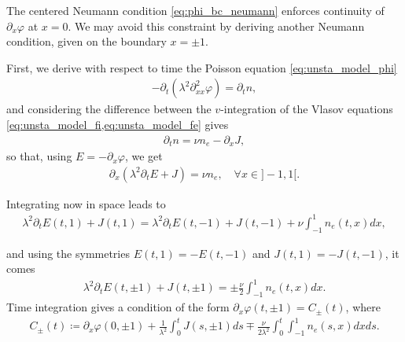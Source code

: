 \documentclass{article}
\numberwithin{equation}{section}
\newcommand{\R}{\mathbb{R}}
\begin{document}
 The centered Neumann condition \cref{eq:phi_bc_neumann} enforces continuity of $\partial_x \varphi$ at $x=0$. We may avoid this constraint by deriving another Neumann condition, given on the boundary $x=\pm 1$.
 
First, we derive with respect to time the Poisson equation \cref{eq:unsta_model_phi}
\begin{align*}
	- \partial_t (\lambda^2\partial_{xx}^2 \varphi) = \partial_t n, 	
\end{align*}
and considering the difference between the $v$-integration of the Vlasov equations \cref{eq:unsta_model_fi,eq:unsta_model_fe} gives 
\begin{align*}
	\partial_t n = \nu n_e - \partial_x J,
\end{align*}
so that, using $E=-\partial_x \varphi$, we get 
\begin{align*}
	\partial_x (\lambda^2\partial_t E + J) = \nu n_e, \quad \forall x\in ]-1, 1[. 	
\end{align*}

Integrating now in space leads to 
\begin{align}\label{eq:ampere_integ}
	\lambda^2\partial_t E(t, 1) + J(t, 1) = \lambda^2\partial_t E(t, -1) + J(t, -1) +\nu \int_{-1}^1 n_e (t, x) dx,  
\end{align}

and using the symmetries $E(t,1)=-E(t, -1)$ and  $J(t,1)=-J(t, -1)$, it comes 
\begin{align}\label{eq:ampere_bc}
	\lambda^2\partial_t E(t, \pm 1) + J(t, \pm 1)  = \pm \frac{\nu}{2} \int_{-1}^1 n_e (t, x)dx.
\end{align}
Time integration gives a condition of the form $\partial_x\varphi(t,\pm 1) = C_{\pm}(t)$, where
\begin{align}\label{eq:ampere_bc_phi}
	C_{\pm} (t) \coloneqq \partial_x \varphi (0,\pm1) + \frac{1}{\lambda^2} \int_0^t J (s, \pm1) ds \mp \frac{\nu}{2 \lambda^2}\int_0^t  \int_{-1}^1 n_e (s, x) dx ds. 
\end{align}
\end{document}
